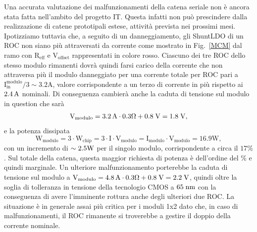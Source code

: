 Una accurata valutazione dei malfunzionamenti della catena seriale non \`e ancora stata fatta nell'ambito del progetto IT. Questa infatti non pu\`o prescindere dalla realizzazione di catene prototipali estese, attivit\`a prevista nei prossimi mesi. Ipotizziamo tuttavia che, a seguito di un danneggiamento, gli ShuntLDO di un ROC non siano pi\`u attraversati da corrente come mostrato in Fig.~\ref{MCM} dal ramo con $\mathrm{R_{eff}}$ e $\mathrm{V_{offset}}$ rappresentati in colore rosso.
Ciascuno dei tre ROC dello stesso modulo rimanenti dovrà quindi farsi carico della corrente che non attraversa pi\`u il modulo danneggiato per una corrente totale per ROC pari a $\mathrm{I_{in}^{modulo}/3 \sim 3.2 A}$, valore corrispondente a un terzo di corrente in più rispetto ai $2.4\rm \, A$ nominali.
Di conseguenza cambier\`a anche la caduta di tensione sul modulo in question che sarà 
\begin{equation*}
  \mathrm{V_{modulo} = 3.2\rm \, A \cdot 0.3 \Omega + 0.8\rm \; V = 1.8 \rm \; V},
\end{equation*}
e la potenza dissipata
\begin{equation*}
  \mathrm{W_{modulo} = 3 \cdot W_{chip} = 3 \cdot I \cdot V_{modulo} = I_{modulo} \cdot V_{modulo} = 16.9W},
\end{equation*}
con un incremento di $\sim2.5{\mathrm W}$ per il singolo modulo, corrispondente a circa il $17\%$. Sul totale della catena, questa maggior richiesta di potenza \`e dell'ordine del \% e quindi marginale. Un ulteriore malfunzionamento porterebbe la caduta di tensione sul modulo a $\mathrm{V_{modulo} = 4.8\rm \, A \cdot 0.3 \Omega + 0.8\rm \; V = 2.2 \rm \; V}$, quindi oltre la soglia di tolleranza in tensione della tecnologio CMOS a $65\rm \; nm$ con la conseguenza di avere l'imminente rottura anche degli ulteriori due ROC. La situazione \`e in generale assai pi\`u critica per i moduli 1x2 dato che, in caso di malfunzionamenti, il ROC rimanente si troverebbe a gestire il doppio della corrente nominale.

